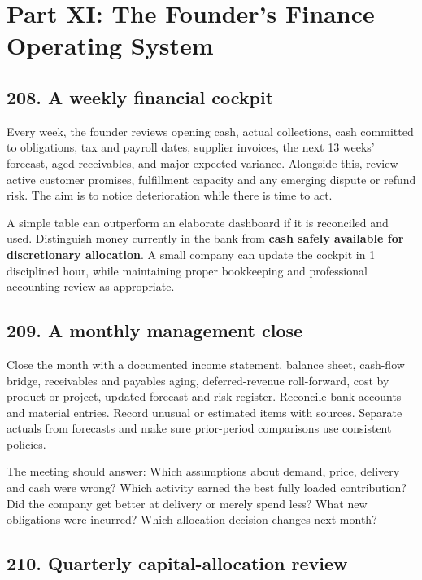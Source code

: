 \section{Part XI: The Founder's Finance Operating System}

\subsection{208. A weekly financial cockpit}


Every week, the founder reviews opening cash, actual collections, cash committed to obligations, tax and payroll dates, supplier invoices, the next 13 weeks' forecast, aged receivables, and major expected variance. Alongside this, review active customer promises, fulfillment capacity and any emerging dispute or refund risk. The aim is to notice deterioration while there is time to act.

A simple table can outperform an elaborate dashboard if it is reconciled and used. Distinguish money currently in the bank from \textbf{cash safely available for discretionary allocation}. A small company can update the cockpit in 1 disciplined hour, while maintaining proper bookkeeping and professional accounting review as appropriate.

\subsection{209. A monthly management close}


Close the month with a documented income statement, balance sheet, cash-flow bridge, receivables and payables aging, deferred-revenue roll-forward, cost by product or project, updated forecast and risk register. Reconcile bank accounts and material entries. Record unusual or estimated items with sources. Separate actuals from forecasts and make sure prior-period comparisons use consistent policies.

The meeting should answer: Which assumptions about demand, price, delivery and cash were wrong? Which activity earned the best fully loaded contribution? Did the company get better at delivery or merely spend less? What new obligations were incurred? Which allocation decision changes next month?

\subsection{210. Quarterly capital-allocation review}


